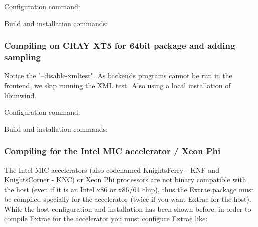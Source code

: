 Configuration command:


Build and installation commands:


\subsubsection{Compiling on CRAY XT5 for 64bit package and adding sampling}

Notice the "--disable-xmltest". As backends programs cannot be run in the frontend, we skip running the XML test. Also using a local installation of libunwind.

Configuration command:


Build and installation commands:


\subsubsection{Compiling for the Intel MIC accelerator / Xeon Phi}

The Intel MIC accelerators (also codenamed KnightsFerry - KNF and KnightsCorner - KNC) or Xeon Phi processors are not binary compatible with the host (even if it is an Intel x86 or x86/64 chip), thus the Extrae package must be compiled specially for the accelerator (twice if you want Extrae for the host). While the host configuration and installation has been shown before, in order to compile Extrae for the accelerator you must configure Extrae like:

